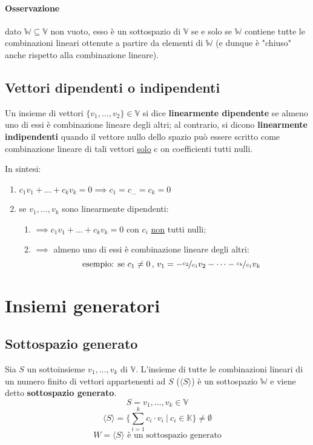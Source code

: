 			\paragraph{Osservazione} dato $ \mathbb{W} \subseteq \mathbb{V} $ non vuoto, esso è un sottospazio di $\mathbb{V}$ se e solo se $\mathbb{W}$ contiene tutte le combinazioni lineari ottenute a partire da elementi di $\mathbb{W}$ (e dunque è "chiuso" anche rispetto alla combinazione lineare).
			
		\subsection{Vettori dipendenti o indipendenti}
			Un insieme di vettori $ \{ v_1, \dots, v_2 \} \in \mathbb{V} $ si dice \textbf{linearmente dipendente} se almeno uno di essi è combinazione lineare degli altri; al contrario, si dicono \textbf{linearmente indipendenti} quando il vettore nullo dello spazio può essere scritto come combinazione lineare di tali vettori \underline{solo} c on coefficienti tutti nulli.
			
			In sintesi:
			\begin{enumerate}
				\item $ c_1v_1 + \dots + c_kv_k = 0 \implies c_1 = c_{\dots} = c_k = 0 $
				\item se $ v_1, \dots, v_k $ sono linearmente dipendenti:
					\begin{enumerate}
						\item $ \implies c_1v_1 + \dots + c_kv_k = 0 $ con $c_i$ \underline{non} tutti nulli;
						\item $ \implies $ almeno uno di essi è combinazione lineare degli altri:
						$$ \text{esempio: se } c_1 \neq 0 \, , \, v_1 = - \nicefrac{c_2}{c_1} v_2 - \dots - \nicefrac{c_k}{c_1} v_k $$
					\end{enumerate}
			\end{enumerate}
		
	\section{Insiemi generatori}
		\subsection{Sottospazio generato}
			Sia $S$ un sottoinsieme $v_1, \dots, v_k$ di $\mathbb{V}$. L'insieme di tutte le combinazioni lineari di un numero finito di vettori appartenenti ad $S$ ($\langle S \rangle$) è un sottospazio $\mathbb{W}$ e viene detto \textbf{sottospazio generato}.
			$$ S = v_1, \dots, v_k \in \mathbb{V} $$
			$$ \langle S \rangle = \biggl\{ \sum_{i=1}^{k} c_i \cdot v_i \: \vert \: c_i \in \mathbb{K} \biggr\} \neq \emptyset $$
			$$ W = \langle S \rangle \text{ è un sottospazio generato}$$
		
